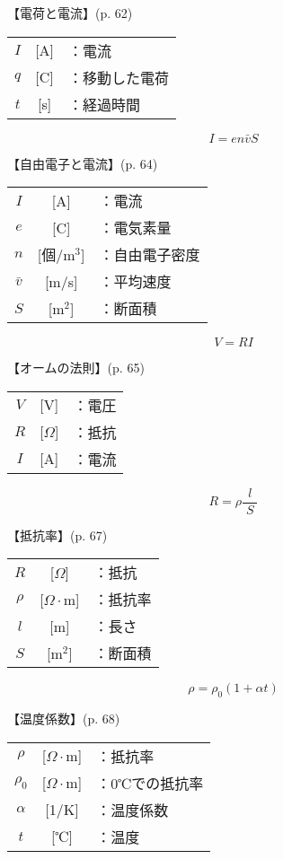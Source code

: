 \documentclass[10pt]{jarticle}
\begin{document}
\vskip3mm
【電荷と電流】{\footnotesize (p. 62)}


\begin{tabular}{ccl}
$I$	&[A]	&：電流 \\
$q$	&[C]	&：移動した電荷\\
$t$	&[s]	&：経過時間
\end{tabular}




\newpage
\[
I = en \bar{v} S
\]


\vskip3mm
【自由電子と電流】{\footnotesize (p. 64)}


\begin{tabular}{ccl}
$I$	&[A]	&：電流 \\
$e$	&[C]	&：電気素量\\
$n$	&[個/m$^3$]	&：自由電子密度\\
$\bar{v}$	&[m/s]	&：平均速度\\
$S$	&[m$^2$]	&：断面積
\end{tabular}






\newpage
\[
V = R I
\]


\vskip3mm
【オームの法則】{\footnotesize (p. 65)}

\begin{tabular}{ccl}
$V$	& [V]	&：電圧\\
$R$	&[$\Omega$]	&：抵抗\\
$I$	&[A]	&：電流
\end{tabular}



\newpage
\[
R = \rho \frac{l}{\; S \;}
\]


\vskip3mm
【抵抗率】{\footnotesize (p. 67)}

\begin{tabular}{ccl}
$R$	&[$\Omega$]	&：抵抗\\
$\rho$	&[$\Omega \cdot $m]	&：抵抗率\\
$l$	&[m]	&：長さ\\
$S$	&[m$^2$]	&：断面積
\end{tabular}





\newpage
\[
\rho = \rho_0 (1 + \alpha t)
\]


\vskip3mm
【温度係数】{\footnotesize (p. 68)}

\begin{tabular}{ccl}
$\rho$	&[$\Omega \cdot $m]	&：抵抗率\\
$\rho_0$	&[$\Omega \cdot $m]	&：0℃での抵抗率\\
$\alpha$	&[1/K]	&：温度係数\\
$t$	&[℃]	&：温度
\end{tabular}
\end{document}
